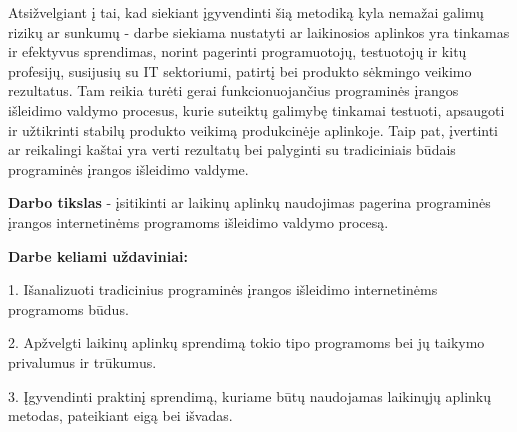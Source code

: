 \documentclass{VUMIFPSkursinis}
\begin{document}
 Atsižvelgiant į tai, kad siekiant įgyvendinti šią metodiką kyla nemažai galimų rizikų ar sunkumų - darbe siekiama nustatyti ar laikinosios aplinkos yra tinkamas ir efektyvus sprendimas, norint pagerinti programuotojų, testuotojų ir kitų profesijų, susijusių su IT sektoriumi, patirtį bei produkto sėkmingo veikimo rezultatus. Tam reikia turėti gerai funkcionuojančius programinės įrangos išleidimo valdymo procesus, kurie suteiktų galimybę tinkamai testuoti, apsaugoti ir užtikrinti stabilų produkto veikimą produkcinėje aplinkoje. Taip pat, įvertinti ar reikalingi kaštai yra verti rezultatų bei palyginti su tradiciniais būdais programinės įrangos išleidimo valdyme.

\bigskip



\textbf{Darbo tikslas} - įsitikinti ar laikinų aplinkų naudojimas pagerina programinės įrangos internetinėms programoms išleidimo valdymo procesą.

\textbf{Darbe keliami uždaviniai:}


1. Išanalizuoti tradicinius programinės įrangos išleidimo internetinėms programoms būdus.

2. Apžvelgti laikinų aplinkų sprendimą tokio tipo programoms bei jų taikymo privalumus ir trūkumus.

3. Įgyvendinti praktinį sprendimą, kuriame būtų naudojamas laikinųjų aplinkų metodas, pateikiant eigą bei išvadas.




\end{document}
